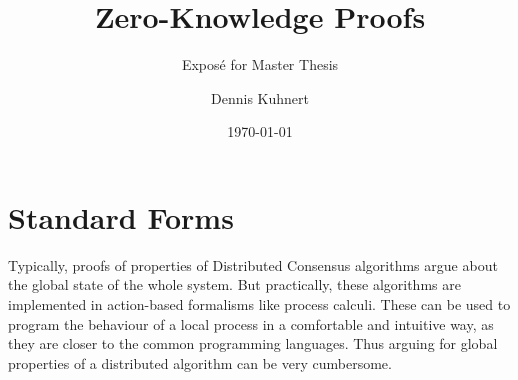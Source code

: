 \documentclass[a4paper]{scrartcl}
\title{Zero-Knowledge Proofs}
\subtitle{Exposé for Master Thesis}
\author{Dennis Kuhnert}
\date{\today}
\begin{document}
\maketitle

\section{Standard Forms}
Typically, proofs of properties of Distributed Consensus algorithms argue about the global state of the whole system.
But practically, these algorithms are implemented in action-based formalisms like process calculi.
These can be used to program the behaviour of a local process in a comfortable and intuitive way, as they are closer to the common programming languages.
Thus arguing for global properties of a distributed algorithm can be very cumbersome.
\cite{bengtson2009psi}



\end{document}
